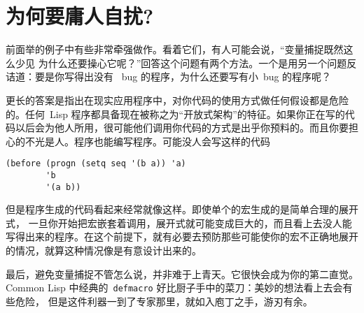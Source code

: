 \section{为何要庸人自扰?}
\label{sec:why_bother}

前面举的例子中有些非常牵强做作。看着它们，有人可能会说，“变量捕捉既然这么少见\pozhehao{}
为什么还要操心它呢？”回答这个问题有两个方法。一个是用另一个问题反诘道：要是你写得出没有
~bug 的程序，为什么还要写有小~bug 的程序呢？

更长的答案是指出在现实应用程序中，对你代码的使用方式做任何假设都是危险的。任何~Lisp 程序都具备现在被称之为“开放式架构”的特征。如果你正在写的代码以后会为他人所用，很可能他们调用你代码的方式是出乎你预料的。而且你要担心的不光是人。程序也能编写程序。可能没人会写这样的代码
\begin{lstlisting}
(before (progn (setq seq '(b a)) 'a)
        'b
        '(a b))
\end{lstlisting}
但是程序生成的代码看起来经常就像这样。即使单个的宏生成的是简单合理的展开式，
一旦你开始把宏嵌套着调用，展开式就可能变成巨大的，而且看上去没人能写得出来的程序。在这个前提下，就有必要去预防那些可能使你的宏不正确地展开的情况，就算这种情况像是有意设计出来的。

最后，避免变量捕捉不管怎么说，并非难于上青天。它很快会成为你的第二直觉。Common Lisp 
中经典的~\verb|defmacro| 好比厨子手中的菜刀：美妙的想法看上去会有些危险，
但是这件利器一到了专家那里，就如入庖丁之手，游刃有余。

